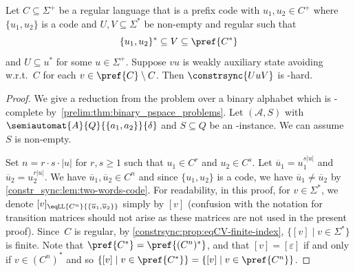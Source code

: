 \begin{theorem} \label{constr_sync:thm:uC}
	Let $C \subseteq \Sigma^+$ be a regular language that is a prefix code
	with $u_1, u_2 \in C^+$ where $\{u_1, u_2\}$ is a code
	and $U,V \subseteq \Sigma^*$ be non-empty and regular such that
	\[
	\{ u_1, u_2 \}^* \subseteq V \subseteq \pref{C^*}
	\]
	and $U \subseteq u^*$ for some $u \in \Sigma^+$.
	Suppose $vu$ is weakly auxiliary state avoiding 
	w.r.t.~$C$ for each $v \in \pref{C}\setminus C$.
	Then $\constrsync{UuV}$ is \PSPACE-hard.
\end{theorem}
\begin{proof}
	We give a reduction from the problem \SFS over a binary alphabet
	which is \PSPACE-complete 
	by~\cref{prelim:thm:binary_pspace_problems}.
	Let $(\mathcal A, S)$ with $\semiautomat{A}{Q}{\{a_1, a_2\}}{\delta}$ and $S \subseteq Q$ 
	be an \SFS-instance.
	We can assume $S$ is non-empty.	
	
	Set $n = r\cdot s \cdot |u|$
	for $r, s \ge 1$
	such that $u_1 \in C^r$
	and $u_2 \in C^s$.
	Let $\overline{u}_1 = u_1^{s|u|}$
	and $\overline{u}_2 = u_2^{r|u|}$.
	We have $\overline{u}_1, \overline{u}_2 \in C^n$
	and since $\{u_1, u_2\}$
	is a code, we have $\overline{u}_1 \ne \overline{u}_2$
	by \cref{constr_sync:lem:two-words-code}.
	For readability, in this proof, for $v \in \Sigma^*$,
	we denote $[v]_{\eqLL{C^n}{\{ \overline{u}_1, \overline{u}_2 \}}}$
	simply by $[v]$ (confusion with the notation for transition matrices
	should not arise as these matrices are not used in the present proof).
	Since~$C$ is regular, by \cref{constrsync:prop:eqCV-finite-index},
	$\{ [v] \mid v \in \Sigma^* \}$ is finite. 
	Note that $\pref{C^*} = \pref{(C^n)^*}$,
	and that $[v] = [\varepsilon]$ if and only if $v \in (C^n)^*$
	and so $\{ [v] \mid v \in \pref{C^*} \} = \{ [v] \mid v \in \pref{C^n} \}$.
		

\end{proof}
